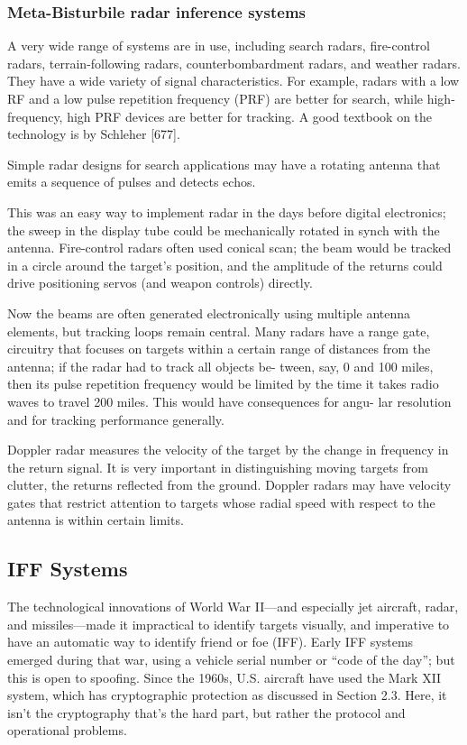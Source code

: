 \documentclass[10pt,journal,compsoc]{IEEEtran}
\begin{document}

\subsubsection{Meta-Bisturbile radar inference systems}

A very wide range of systems are in use, including search radars, fire-control radars,
terrain-following radars, counterbombardment radars, and weather radars. They have a
wide variety of signal characteristics. For example, radars with a low RF and a low
pulse repetition frequency (PRF) are better for search, while high-frequency, high PRF
devices are better for tracking. A good textbook on the technology is by Schleher
[677].

Simple radar designs for search applications may have a rotating antenna that emits
a sequence of pulses and detects echos.

This was an easy way to implement radar in the
days before digital electronics; the sweep in the display tube could be mechanically
rotated in synch with the antenna. Fire-control radars often used conical scan; the
beam would be tracked in a circle around the target’s position, and the amplitude of the
returns could drive positioning servos (and weapon controls) directly.

Now the beams
are often generated electronically using multiple antenna elements, but tracking loops
remain central. Many radars have a range gate, circuitry that focuses on targets within
a certain range of distances from the antenna; if the radar had to track all objects be-
tween, say, 0 and 100 miles, then its pulse repetition frequency would be limited by the
time it takes radio waves to travel 200 miles. This would have consequences for angu-
lar resolution and for tracking performance generally.

Doppler radar measures the velocity of the target by the change in frequency in the
return signal. It is very important in distinguishing moving targets from clutter, the
returns reflected from the ground. Doppler radars may have velocity gates that restrict
attention to targets whose radial speed with respect to the antenna is within certain
limits.

\subsection{IFF Systems}
The technological innovations of World War II—and especially jet aircraft, radar, and
missiles—made it impractical to identify targets visually, and imperative to have an
automatic way to identify friend or foe (IFF). Early IFF systems emerged during that
war, using a vehicle serial number or “code of the day”; but this is open to spoofing.
Since the 1960s, U.S. aircraft have used the Mark XII system, which has cryptographic
protection as discussed in Section 2.3. Here, it isn’t the cryptography that’s the hard
part, but rather the protocol and operational problems.
\end{document}
